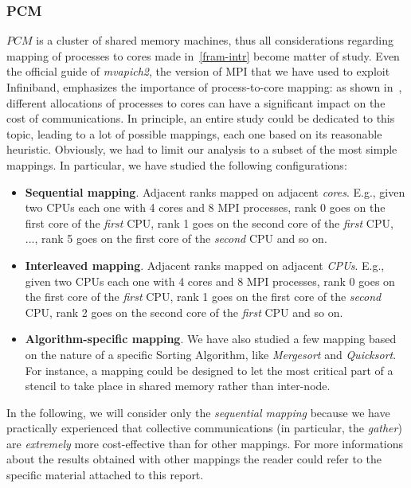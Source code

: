 \subsubsection{PCM}
$PCM$ is a cluster of shared memory machines, thus all considerations regarding mapping of processes to cores made in~\ref{fram-intr} become matter of study. Even the official guide of \textit{mvapich2}, the version of MPI that we have used to exploit Infiniband, emphasizes the importance of process-to-core mapping: as shown in~\cite{MVAPICH2-MAPPING}, different allocations of processes to cores can have a significant impact on the cost of communications. In principle, an entire study could be dedicated to this topic, leading to a lot of possible mappings, each one based on its reasonable heuristic. Obviously, we had to limit our analysis to a subset of the most simple mappings. In particular, we have studied the following configurations:   
\begin{itemize}
\item \textbf{Sequential mapping}. Adjacent ranks mapped on adjacent \textit{cores}. E.g., given two CPUs each one with 4 cores and 8 MPI processes, rank 0 goes on the first core of the \textit{first} CPU, rank 1 goes on the second core of the \textit{first} CPU, ..., rank 5 goes on the first core of the \textit{second} CPU and so on.
\item \textbf{Interleaved mapping}. Adjacent ranks mapped on adjacent \textit{CPUs}. E.g., given two CPUs each one with 4 cores and 8 MPI processes, rank 0 goes on the first core of the \textit{first} CPU, rank 1 goes on the first core of the \textit{second} CPU, rank 2 goes on the second core of the \textit{first} CPU and so on.
\item \textbf{Algorithm-specific mapping}. We have also studied a few mapping based on the nature of a specific Sorting Algorithm, like \textit{Mergesort} and \textit{Quicksort}. For instance, a mapping could be designed to let the most critical part of a stencil to take place in shared memory rather than inter-node.  
\end{itemize}
In the following, we will consider only the \textit{sequential mapping} because we have practically experienced that collective communications (in particular, the \textit{gather}) are \textit{extremely} more cost-effective than for other mappings. For more informations about the results obtained with other mappings the reader could refer to the specific material attached to this report.


